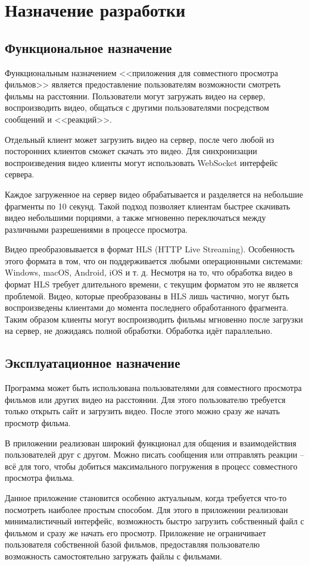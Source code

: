\section{Назначение разработки}

\subsection{Функциональное назначение}

Функциональным назначением <<приложения для совместного просмотра фильмов>> является предоставление пользователям возможности смотреть фильмы на расстоянии.
Пользователи могут загружать видео на сервер, воспроизводить видео, общаться с другими пользователями посредством сообщений и <<реакций>>.

Отдельный клиент может загрузить видео на сервер, после чего любой из посторонних клиентов сможет скачать это видео.
Для синхронизации воспроизведения видео клиенты могут использовать WebSocket интерфейс сервера.

Каждое загруженное на сервер видео обрабатывается и разделяется на небольшие фрагменты по 10 секунд.
Такой подход позволяет клиентам быстрее скачивать видео небольшими порциями, а также мгновенно переключаться между различными разрешениями в процессе просмотра.

Видео преобразовывается в формат HLS (HTTP Live Streaming).
Особенность этого формата в том, что он поддерживается любыми операционными системами: Windows, macOS, Android, iOS и т. д.
Несмотря на то, что обработка видео в формат HLS требует длительного времени, с текущим форматом это не является проблемой.
Видео, которые преобразованы в HLS лишь частично, могут быть воспроизведены клиентами до момента последнего обработанного фрагмента.
Таким образом клиенты могут воспроизводить фильмы мгновенно после загрузки на сервер, не дожидаясь полной обработки.
Обработка идёт параллельно.

\subsection{Эксплуатационное назначение}

Программа может быть использована пользователями для совместного просмотра фильмов или других видео на расстоянии.
Для этого пользователю требуется только открыть сайт и загрузить видео.
После этого можно сразу же начать просмотр фильма.

В приложении реализован широкий функционал для общения и взаимодействия пользователей друг с другом.
Можно писать сообщения или отправлять реакции -- всё для того, чтобы добиться максимального погружения в процесс совместного просмотра фильма.

Данное приложение становится особенно актуальным, когда требуется что-то посмотреть наиболее простым способом.
Для этого в приложении реализован минималистичный интерфейс, возможность быстро загрузить собственный файл с фильмом и сразу же начать его просмотр.
Приложение не ограничивает пользователя собственной базой фильмов, предоставляя пользователю возможность самостоятельно загружать файлы с фильмами.